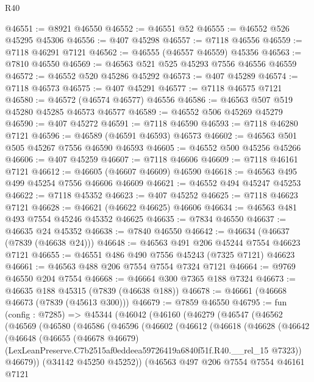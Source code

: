 \begin{lexlean}{R40}
\begin{coremodule}
@46551 := @8921 @46550
@46552 := @46551 @52
@46555 := @46552 @526 @45295 @45306
@46556 := @407 @45298
@46557 := @7118 @46556
@46559 := @7118 @46291 @7121
@46562 := @46555 (@46557 @46559) @45356
@46563 := @7810 @46550
@46569 := @46563 @521 @525 @45293 @7556 @46556 @46559
@46572 := @46552 @520 @45286 @45292
@46573 := @407 @45289
@46574 := @7118 @46573
@46575 := @407 @45291
@46577 := @7118 @46575 @7121
@46580 := @46572 (@46574 @46577) @46556
@46586 := @46563 @507 @519 @45280 @45285 @46573 @46577
@46589 := @46552 @506 @45269 @45279
@46590 := @407 @45272
@46591 := @7118 @46590
@46593 := @7118 @46280 @7121
@46596 := @46589 (@46591 @46593) @46573
@46602 := @46563 @501 @505 @45267 @7556 @46590 @46593
@46605 := @46552 @500 @45256 @45266
@46606 := @407 @45259
@46607 := @7118 @46606
@46609 := @7118 @46161 @7121
@46612 := @46605 (@46607 @46609) @46590
@46618 := @46563 @495 @499 @45254 @7556 @46606 @46609
@46621 := @46552 @494 @45247 @45253
@46622 := @7118 @45352
@46623 := @407 @45252
@46625 := @7118 @46623 @7121
@46628 := @46621 (@46622 @46625) @46606
@46634 := @46563 @481 @493 @7554 @45246 @45352 @46625
@46635 := @7834 @46550
@46637 := @46635 @24 @45352
@46638 := @7840 @46550
@46642 := @46634 (@46637 (@7839 (@46638 @24)))
@46648 := @46563 @491 @206 @45244 @7554 @46623 @7121
@46655 := @46551 @486 @490 @7556 @45243 (@7325 @7121) @46623
@46661 := @46563 @488 @206 @7554 @7554 @7324 @7121
@46664 := @9769 @46550 @204 @7554
@46668 := @46664 @300 @7365 @188 @7324
@46673 := @46635 @188 @45315 (@7839 (@46638 @188))
@46678 := @46661 (@46668 @46673 (@7839 (@45613 @300)))
@46679 := @7859 @46550
@46795 := fun (config : @7285) =>
  @45344
    (@46042
      (@46160
        (@46279
          (@46547
            (@46562
              (@46569
                (@46580
                  (@46586
                    (@46596
                      (@46602
                        (@46612
                          (@46618
                            (@46628
                              (@46642
                                (@46648
                                  (@46655
                                    (@46678 @46679)
                                    (LexLeanPreserve.C7b2515af0eddeea59726419a6840f51f.R40.__rel_15
                                      @7323))
                                  @46679))
                              (@34142 @45250 @45252))
                            (@46563
                              @497
                              @206
                              @7554
                              @7554
                              @46161
                              @7121

\end{coremodule}
\end{lexlean}
